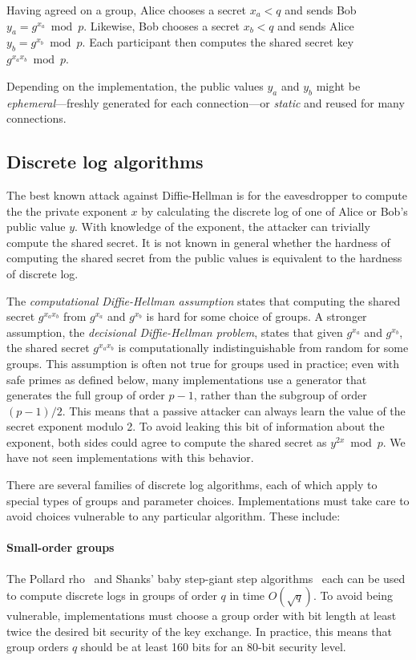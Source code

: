 Having agreed on a group, Alice chooses a secret $x_a < q$ and sends Bob $y_a =
g^{x_a}\bmod p$.  Likewise, Bob chooses a secret $x_b < q$ and sends Alice $y_b =
g^{x_b}\bmod p$. Each participant then computes the shared secret key
$g^{x_a x_b}\bmod p$.%

Depending on the implementation, the public values $y_a$ and $y_b$ might be
\emph{ephemeral}---freshly generated for each connection---or \emph{static} and
reused for many connections.

\subsection{Discrete log algorithms}

The best known attack against Diffie-Hellman is for the eavesdropper to compute
the the private exponent $x$ by calculating the discrete log of one of Alice or
Bob's public value $y$. With knowledge of the exponent, the attacker can
trivially compute the shared secret.  It is not known in general whether the
hardness of computing the shared secret from the public values is equivalent to
the hardness of discrete log.

The \emph{computational Diffie-Hellman assumption} states that computing the
shared secret $g^{x_ax_b}$ from $g^{x_a}$ and $g^{x_b}$ is hard for some choice
of groups.  A stronger assumption, the \emph{decisional Diffie-Hellman
problem}, states that given $g^{x_a}$ and $g^{x_b}$, the shared secret
$g^{x_ax_b}$ is computationally indistinguishable from random for some groups.
This assumption is often not true for groups used in practice; even with safe
primes as defined below, many implementations use a generator that generates
the full group of order $p-1$, rather than the subgroup of order $(p-1)/2$.  This means
that a passive attacker can always learn the value of the secret exponent modulo 2.
To avoid leaking this bit of information about the exponent, both sides could agree to 
compute the shared secret as $y^{2x} \bmod p$.  We have not seen implementations
with this behavior.

There are several families of discrete log algorithms, each of which apply to
special types of groups and parameter choices. Implementations must take care
to avoid choices vulnerable to any particular algorithm. These include:

\paragraph{Small-order groups}
The Pollard rho~\cite{pollard1975monte} and Shanks' baby step-giant step
algorithms~\cite{shanks1971class} each can be used to compute discrete logs in
groups of order $q$ in time $O(\sqrt{q})$.  To avoid being vulnerable,
implementations must choose a group order with bit length at least twice the
desired bit security of the key exchange. In practice, this means that group
orders $q$ should be at least 160 bits for an 80-bit security level.

